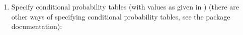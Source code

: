 \documentclass[10pt]{article}\usepackage[]{graphicx}\usepackage[]{xcolor}
\begin{document}
\begin{enumerate}
\item Specify conditional probability tables (with values as given in
  \cite{lau/spieg:88}) (there are other ways of specifying conditional
  probability tables, see the package documentation):






\end{enumerate}
\end{document}

